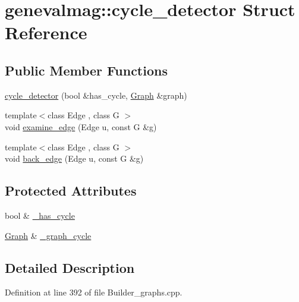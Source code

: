 \hypertarget{structgenevalmag_1_1cycle__detector}{
\section{genevalmag::cycle\_\-detector Struct Reference}
\label{structgenevalmag_1_1cycle__detector}
}
\subsection*{Public Member Functions}
\begin{DoxyCompactItemize}
\item 
\hyperlink{structgenevalmag_1_1cycle__detector_ad33c61b557029f98461f984f43a25e2d}{cycle\_\-detector} (bool \&has\_\-cycle, \hyperlink{namespacegenevalmag_a4a96de9ebfc7d48233406ab9cad55cb5}{Graph} \&graph)
\item 
{\footnotesize template$<$class Edge , class G $>$ }\\void \hyperlink{structgenevalmag_1_1cycle__detector_a44fccd4a457ae19a0b9fb61cad4f40a7}{examine\_\-edge} (Edge u, const G \&g)
\item 
{\footnotesize template$<$class Edge , class G $>$ }\\void \hyperlink{structgenevalmag_1_1cycle__detector_a9c656f2de80c65c02f061bc75268ea32}{back\_\-edge} (Edge u, const G \&g)
\end{DoxyCompactItemize}
\subsection*{Protected Attributes}
\begin{DoxyCompactItemize}
\item 
bool \& \hyperlink{structgenevalmag_1_1cycle__detector_afbb82ee351ec3962b57fcf2b0d21b3b4}{\_\-has\_\-cycle}
\item 
\hyperlink{namespacegenevalmag_a4a96de9ebfc7d48233406ab9cad55cb5}{Graph} \& \hyperlink{structgenevalmag_1_1cycle__detector_a7ea4fce7ca4725c4734493281f3742b0}{\_\-graph\_\-cycle}
\end{DoxyCompactItemize}


\subsection{Detailed Description}


Definition at line 392 of file Builder\_\-graphs.cpp.



